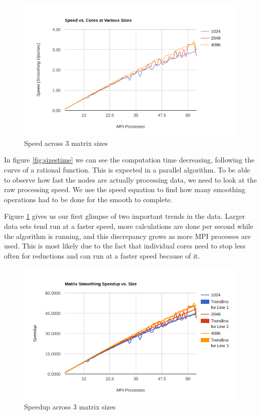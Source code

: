 \documentclass[a4paper,10pt]{report}
\begin{document}
\begin{figure}[!b]
 \centering
 \includegraphics[width=\textwidth]{./images/sizes-speed.png}
 \caption{Speed across 3 matrix sizes}
 \label{fig:sizespeed}
\end{figure}

In figure \ref{fig:sizestime} we can see the computation time decreasing, following the curve of a rational function. This is expected in a parallel algorithm. To be able to observe how fast the nodes are actually processing data, we need to look at the raw processing speed. We use the speed equation to find how many smoothing operations had to be done for the smooth to complete.

Figure \ref{fig:sizespeed} gives us our first glimpse of two important trends in the data. Larger data sets tend run at a faster speed, more calculations are done per second while the algorithm is running, and this discrepancy grows as more MPI processes are used. This is most likely due to the fact that individual cores need to stop less often for reductions and can run at a faster speed because of it.

\begin{figure}[!t]
 \centering
 \includegraphics[width=\textwidth]{./images/sizes-speedup.png}
 \caption{Speedup across 3 matrix sizes}
 \label{fig:sizespeedup}
\end{figure}
\end{document}
